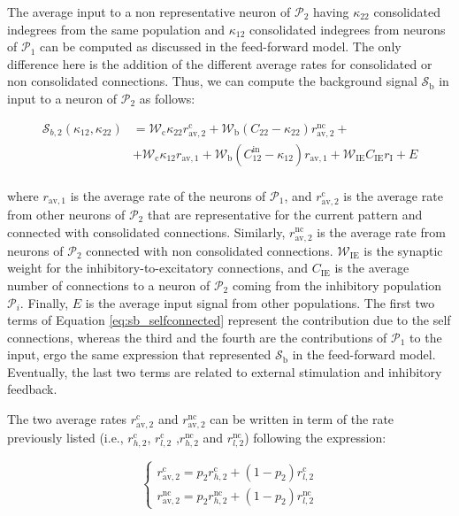 \documentclass[a4paper, 12pt, twoside, openright]{book}
\newcommand{\popI}{\mathcal{P}_1}
\newcommand{\popII}{\mathcal{P}_2}
\newcommand{\popinh}{\mathcal{P}_i}
\newcommand{\Wb}{\mathcal{W}_\text{b}}
\newcommand{\Wc}{\mathcal{W}_\text{c}}
\newcommand{\WIE}{\mathcal{W}_\text{IE}}
\newcommand{\Sb}{\mathcal{S}_\text{b}}
\begin{document}
The average input to a non representative neuron of $\popII$ having $\kappa_{22}$ consolidated indegrees from the same population and $\kappa_{12}$ consolidated indegrees from neurons of $\popI$ can be computed as discussed in the feed-forward model. The only difference here is the addition of the different average rates for consolidated or non consolidated connections. Thus, we can compute the background signal $\Sb$ in input to a neuron of $\popII$ as follows:

\begin{equation}
\label{eq:sb_selfconnected}
\begin{split}
    \mathcal{S}_{b,2} (\kappa_{12}, \kappa_{22}) &=
    \Wc \kappa_{22} r_{\text{av},2}^{\text{c}}+ \Wb (C_{22}-\kappa_{22}) r_{\text{av},2}^{\text{nc}} +\\ &+
    \Wc \kappa_{12} r_{\text{av},1} 
    + \Wb (C_{12}^\text{in}-\kappa_{12}) r_{\text{av},1} +
    \WIE C_\text{IE} r_\text{I} + E \\
\end{split}
\end{equation}

where $r_{\text{av},1}$ is the average rate of the neurons of $\popI$, and $r_{\text{av},2}^{\text{c}}$ is the average rate from other neurons of $\popII$ that are representative for the current pattern and connected with consolidated connections. Similarly, $r_{\text{av},2}^{\text{nc}}$ is the average rate from neurons of $\popII$ connected with non consolidated connections. $\WIE$ is the synaptic weight for the inhibitory-to-excitatory connections, and 
$C_\text{IE}$ is the average number of connections to a neuron of $\popII$ coming from the inhibitory population $\popinh$. Finally, $E$ is the average input signal from other populations. The first two terms of Equation \eqref{eq:sb_selfconnected} represent the contribution due to the self connections, whereas the third and the fourth are the contributions of $\popI$ to the input, ergo the same expression that represented $\Sb$ in the feed-forward model. Eventually, the last two terms are related to external stimulation and inhibitory feedback.


The two average rates $r_{\text{av},2}^{\text{c}}$ and $r_{\text{av},2}^{\text{nc}}$ can be written in term of the rate previously listed (i.e., $r_{h,2}^{\text{c}}$, $r_{l,2}^{\text{c}}$ ,$r_{h,2}^{\text{nc}}$ and $r_{l,2}^{\text{nc}}$) following the expression:

\begin{equation}
    \begin{cases}
     r_{\text{av},2}^{\text{c}}= p_2 r_{h,2}^{\text{c}}+ (1-p_2)r_{l,2}^{\text{c}}\\
     r_{\text{av},2}^{\text{nc}}= p_2 r_{h,2}^{\text{nc}}+ (1-p_2)r_{l,2}^{\text{nc}}
    \end{cases}
\end{equation}
\end{document}

